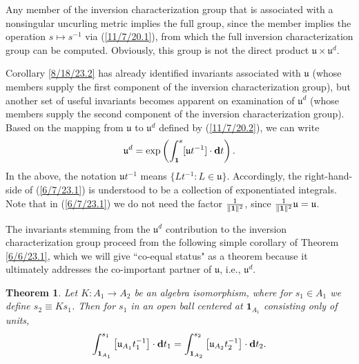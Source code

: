 \documentclass{amsart}
\numberwithin{equation}{section}
\newtheorem{theorem}{Theorem}
\theoremstyle{definition}
\numberwithin{theorem}{section}
\begin{document}
Any member of the inversion characterization group that is associated with a nonsingular uncurling metric implies the full group, since the member implies the operation $s\mapsto s^{-1}$ via (\ref{11/7/20.1}), from which the full inversion characterization group can be computed.  Obviously, this group is not the direct product $\mathfrak{u}\times\mathfrak{u}^d$. 

Corollary \ref{8/18/23.2} has already identified invariants associated with $\mathfrak{u}$ (whose members supply the first component of the inversion characterization group), but another set of useful invariants becomes apparent on examination of $\mathfrak{u}^d$ (whose members supply the second component of the inversion characterization group).  Based on the mapping from $\mathfrak{u}$ to $\mathfrak{u}^d$ defined by (\ref{11/7/20.2}),  we can write \begin{equation}  \mathfrak{u}^d = \exp\left(\int_{\bf 1}^s [\mathfrak{u}t^{-1}]\cdot \mathbf{d}t\right). \label{6/7/23.1}\end{equation}  In the above, the notation $\mathfrak{u}t^{-1}$ means $\{Lt^{-1}: L\in \mathfrak{u}\}$.  Accordingly, the right-hand-side of (\ref{6/7/23.1}) is understood to be a collection of exponentiated integrals.   Note that in (\ref{6/7/23.1}) we do not need the factor $\frac{1}{\|{\bf 1}\|^2}$, since $\frac{1}{\|{\bf 1}\|^2}\mathfrak{u}=\mathfrak{u}$.  

The invariants stemming from the $\mathfrak{u}^d$ contribution to the inversion characterization group proceed from the following simple corollary of Theorem \ref{6/6/23.1}, which we will give ``co-equal status" as a theorem because it ultimately addresses the co-important  partner of $\mathfrak{u}$, i.e., $\mathfrak{u}^d$. 

\begin{theorem}\label{6/6/23.2} Let $K:A_1\rightarrow A_2$ be an algebra isomorphism, where for $s_1\in A_1$ we define $s_2\equiv Ks_1$.  Then for $s_1$ in an open ball centered at $\mathbf{1}_{A_1}$ consisting only of units, \begin{equation}\label{9/6/24.2} \int_{{\bf 1}_{A_1}}^{s_1} \left[\mathfrak{u}_{A_1}t_1^{-1}\right]\cdot \mathbf{d}t_1 
= \int_{{\bf 1}_{A_2}}^{s_2} \left[\mathfrak{u}_{A_2}t_2^{-1}\right]\cdot \mathbf{d}t_2 . \end{equation} \end{theorem}
\end{document}
